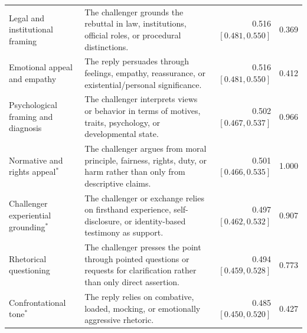 \begin{tabularx}{\textwidth}{@{}>{\raggedright\arraybackslash}p{} X r r@{}}
Legal and institutional framing & The challenger grounds the rebuttal in law, institutions, official roles, or procedural distinctions. & 0.516 {\tiny$[0.481, 0.550]$} & 0.369 \\
Emotional appeal and empathy & The reply persuades through feelings, empathy, reassurance, or existential/personal significance. & 0.516 {\tiny$[0.481, 0.550]$} & 0.412 \\
Psychological framing and diagnosis & The challenger interprets views or behavior in terms of motives, traits, psychology, or developmental state. & 0.502 {\tiny$[0.467, 0.537]$} & 0.966 \\
Normative and rights appeal$^{*}$ & The challenger argues from moral principle, fairness, rights, duty, or harm rather than only from descriptive claims. & 0.501 {\tiny$[0.466, 0.535]$} & 1.000 \\
Challenger experiential grounding$^{*}$ & The challenger or exchange relies on firsthand experience, self-disclosure, or identity-based testimony as support. & 0.497 {\tiny$[0.462, 0.532]$} & 0.907 \\
Rhetorical questioning & The challenger presses the point through pointed questions or requests for clarification rather than only direct assertion. & 0.494 {\tiny$[0.459, 0.528]$} & 0.773 \\
Confrontational tone$^{*}$ & The reply relies on combative, loaded, mocking, or emotionally aggressive rhetoric. & 0.485 {\tiny$[0.450, 0.520]$} & 0.427 \\
\bottomrule
\end{tabularx}
